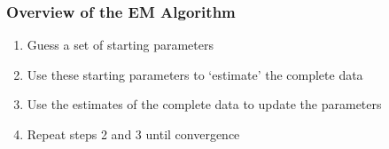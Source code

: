 \documentclass{beamer}
\begin{document}
\begin{frame}
  \frametitle{Overview of the EM Algorithm}

\begin{enumerate}
    \item Guess a set of starting parameters 
    \item Use these starting parameters to `estimate' the complete data
    \item Use the estimates of the complete data to update the parameters
    \item Repeat steps 2 and 3 until convergence
\end{enumerate}

\end{frame}



{ 

}
\end{document}
